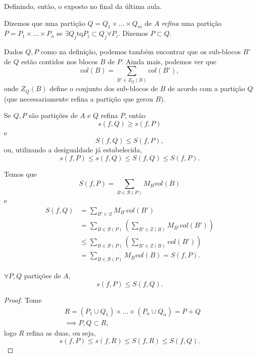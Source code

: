 
Definindo, então, o exposto no final da última aula.

\begin{definition}
    Dizemos que uma partição $Q=Q_1\times \ldots\times Q_m$ de $A$ \emph{refina} uma partição $P=P_1\times \ldots\times P_n$ se $\exists Q_j \text{tq} P_i\subset Q_j \forall P_i$. Dizemos $P\subset Q$.
\end{definition}

Dados $Q, P$ como na definição, podemos também encontrar que os sub-blocos $B'$ de $Q$ estão contidos nos blocos $B$ de $P$. Ainda mais, podemos ver que \[
    vol\left( B \right) = \sum_{B' \in Z_Q\left( B \right)  } vol\left( B' \right)
,\] onde $Z_Q\left( B \right) $ define o conjunto dos sub-blocos de $B$ de acordo com a partição $Q$ (que necessariamente refina a partição que gerou $B$).

\begin{prop}
    Se $Q,P$ são partições de $A$ e $Q$ refina $P$, então \[
    s\left( f, Q \right) \ge s\left( f,P \right) 
    \] e \[
    S\left( f,Q \right) \le S\left( f,P \right) 
    ,\] ou, utilizando a desigualdade já estabelecida, \[
     s\left( f,P \right) \le s\left( f, Q \right) \le S\left( f,Q \right) \le S\left( f,P \right) 
    .\] 
\end{prop}
\begin{demo}
    Temos que \[
        S\left( f, P \right) = \sum_{B\in \mathcal{B}\left( P \right) } M_B vol\left( B \right) 
    \] e 
    \begin{align*}
	S\left( f, Q \right) &=\sum_{B'\in \mathcal{Q}} M_{B'} vol\left( B' \right) \\
			     &= \sum_{B\in \mathcal{B}\left( P \right) } \left( 
				 \sum_{B'\in Z\left( B \right) } M_{B'} vol\left( B' \right) 
			     \right) \\
			     &\le \sum_{B\in \mathcal{B}\left( P \right) } \left( 
				 \sum_{B'\in Z\left( B \right) } vol\left( B' \right) 
			     \right) \\
			     &= \sum_{B\in \mathcal{B}\left( P \right) } M_B vol\left( B \right)  = S\left( f, P \right) 
    .\end{align*}
\end{demo}

\begin{corollary}
    $\forall P,Q$ partições de $A$, \[
    s\left( f, P \right) \le S\left( f,Q \right) 
    .\] 
\end{corollary}
\begin{proof}
    Tome
    \begin{align*}
	& R = \left( P_1\cup Q_1 \right) \times \ldots\times \left( P_n\cup Q_n \right) = P + Q \\
	&\implies P,Q \subset R
    ,\end{align*}
    logo $R$ refina as duas, ou seja, \[
    s\left( f,P \right) \le s\left( f,R \right) \le S\left( f,R \right) \le S\left( f,Q \right) 
    .\] 
\end{proof}

